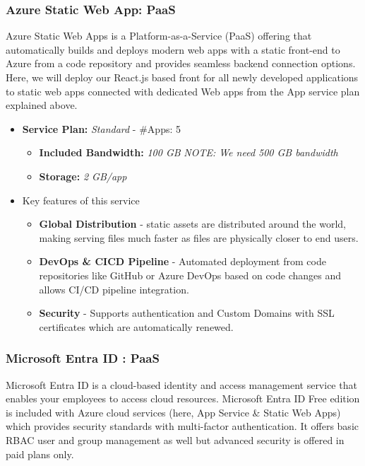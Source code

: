 \documentclass{llncs}
\begin{document}
\subsubsection{Azure Static Web App: PaaS} \leavevmode\newline
Azure Static Web Apps is a Platform-as-a-Service (PaaS) offering that automatically builds and deploys modern web apps with a static front-end to Azure from a code repository and provides seamless backend connection options.
Here, we will deploy our React.js based front for all newly developed applications to static web apps connected with dedicated Web apps from the App service plan explained above.
\begin{itemize}
    \item \textbf{Service Plan:} \textit{Standard} - \#Apps: 5

          \begin{itemize}
              \item \textbf{Included Bandwidth:} \textit{100 GB}
                    \textit{NOTE: We need 500 GB bandwidth}
              \item \textbf{Storage:} \textit{2 GB/app}
          \end{itemize}

    \item Key features of this service
          \begin{itemize}
              \item \textbf{Global Distribution} - static assets are distributed around the world, making serving files much faster as files are physically closer to end users.
              \item \textbf{DevOps \& CICD Pipeline} - Automated deployment from code repositories like GitHub or Azure DevOps based on code changes and allows CI/CD pipeline integration.
              \item \textbf{Security} - Supports authentication and Custom Domains with SSL certificates which are automatically renewed.
          \end{itemize}
\end{itemize}


\subsubsection{Microsoft Entra ID : PaaS} \leavevmode\newline
Microsoft Entra ID is a cloud-based identity and access management service that enables your employees to access cloud resources. Microsoft Entra ID Free edition is included with Azure cloud services (here, App Service \& Static Web Apps) which
provides security standards with multi-factor authentication.
It offers basic RBAC user and group management as well but advanced security is offered in paid plans only.
\end{document}
